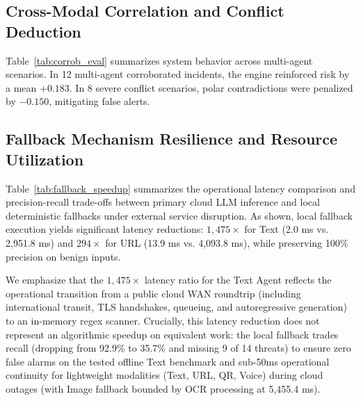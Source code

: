 \documentclass[conference]{IEEEtran}
\begin{document}
\subsection{Cross-Modal Correlation and Conflict Deduction}
Table~\ref{tab:corrob_eval} summarizes system behavior across multi-agent scenarios. In 12 multi-agent corroborated incidents, the engine reinforced risk by a mean $+0.183$. In 8 severe conflict scenarios, polar contradictions were penalized by $-0.150$, mitigating false alerts.

\begin{table}[htbp]
\caption{Cross-Modal Correlation and Conflict Resolution Performance}
\label{tab:corrob_eval}
\centering
{}
\end{table}

\subsection{Fallback Mechanism Resilience and Resource Utilization}
Table~\ref{tab:fallback_speedup} summarizes the operational latency comparison and precision-recall trade-offs between primary cloud LLM inference and local deterministic fallbacks under external service disruption. As shown, local fallback execution yields significant latency reductions: $1,475\times$ for Text (2.0 ms vs. 2,951.8 ms) and $294\times$ for URL (13.9 ms vs. 4,093.8 ms), while preserving 100\% precision on benign inputs.

We emphasize that the $1,475\times$ latency ratio for the Text Agent reflects the operational transition from a public cloud WAN roundtrip (including international transit, TLS handshakes, queueing, and autoregressive generation) to an in-memory regex scanner. Crucially, this latency reduction does not represent an algorithmic speedup on equivalent work: the local fallback trades recall (dropping from 92.9\% to 35.7\% and missing 9 of 14 threats) to ensure zero false alarms on the tested offline Text benchmark and sub-50ms operational continuity for lightweight modalities (Text, URL, QR, Voice) during cloud outages (with Image fallback bounded by OCR processing at 5,455.4 ms).
\end{document}

